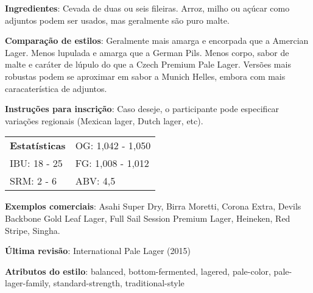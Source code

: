 \textbf{Ingredientes}: Cevada de duas ou seis fileiras. Arroz, milho ou açúcar como adjuntos podem ser usados, mas geralmente são puro malte.

\textbf{Comparação de estilos}: Geralmente mais amarga e encorpada que a Amercian Lager. Menos lupulada e amarga que a German Pils. Menos corpo, sabor de malte e caráter de lúpulo do que a Czech Premium Pale Lager. Versões mais robustas podem se aproximar em sabor a Munich Helles, embora com mais caracaterística de adjuntos.

\textbf{Instruções para inscrição}: Caso deseje, o participante pode especificar variações regionais (Mexican lager, Dutch lager, etc).

\begin{tabular}{@{}p{35mm}p{35mm}@{}}
  \textbf{Estatísticas} & OG: 1,042 - 1,050 \\
  IBU: 18 - 25  & FG: 1,008 - 1,012  \\
  SRM: 2 - 6   & ABV: 4,5%
\end{tabular}

\textbf{Exemplos comerciais}: Asahi Super Dry, Birra Moretti, Corona Extra, Devils Backbone Gold Leaf Lager, Full Sail Session Premium Lager, Heineken, Red Stripe, Singha.

\textbf{Última revisão}: International Pale Lager (2015)

\textbf{Atributos do estilo}: balanced, bottom-fermented, lagered, pale-color, pale-lager-family, standard-strength, traditional-style

